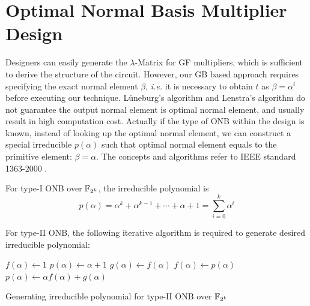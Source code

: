 \section{Optimal Normal Basis Multiplier Design}
Designers can easily generate the $\lambda$-Matrix for GF multipliers, which is sufficient to derive the 
structure of the circuit. However, our GB based approach requires specifying the exact normal element $\beta$,
{\it i.e. } it is necessary to obtain $t$ as $\beta = \alpha^t$ before executing our technique.
L\"uneburg's algorithm and Lenstra's algorithm do not guarantee the output normal element is optimal 
normal element, and usually result in high computation cost. Actually if the type of ONB within the design 
is known, instead of looking up the optimal normal element, we can construct a special irreducible $p(\alpha)$
such that optimal normal element equals to the primitive element: $\beta=\alpha$. The concepts and algorithms 
refer to IEEE standard 1363-2000 \cite{IEEE1363}.

For type-I ONB over ${\mathbb{F}}_{2^k}$, the irreducible polynomial is 
$$p(\alpha) = \alpha^k+\alpha^{k-1}+\cdots+\alpha+1
= \sum_{i=0}^k \alpha^i$$ 

For type-II ONB, the following iterative algorithm is required to generate desired 
irreducible polynomial:

\begin{algorithm}[H]
\SetAlgoNoLine
\LinesNumbered

  $f(\alpha)\gets 1$\;
  $p(\alpha)\gets \alpha+1$\;
  {
  	$g(\alpha)\gets f(\alpha)$\;
	$f(\alpha)\gets p(\alpha)$\;
	$p(\alpha)\gets \alpha f(\alpha)+g(\alpha)$\;
  }\
\caption {Generating irreducible polynomial for type-II ONB over ${\mathbb{F}}_{2^k}$}
\label{alg:ieee1363}
\end{algorithm}
\DecMargin{1em}
\vspace{0.2in}